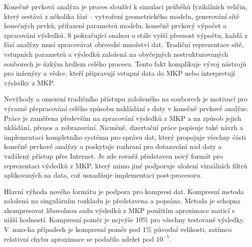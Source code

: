 \noindent
Kone\v{c}n\v{e} prvkov\'a anal\'yza je proces slou\v{z}\'ic\'i k simulaci pr\r{u}b\v{e}h\r{u} fyzik\'aln\'ich veli\v{c}in, kter\'y sest\'av\'a z n\v{e}kolika f\'az\'i -- vytvo\v{r}en\'i geometrick\'eho modelu, generov\'an\'i s\'it\v{e} kone\v{c}n\'ych prvk\r{u}, p\v{r}i\v{r}azen\'i parametr\r{u} modelu, kone\v{c}n\v{e} prvkov\'y v\'ypo\v{c}et a zpracov\'an\'i v\'ysledk\r{u}. S pokra\v{c}uj\'ic\'i snahou o st\'ale vy\v{s}\v{s}\'i p\v{r}esnost v\'ypo\v{c}tu, ka\v{z}d\'a z f\'az\'i anal\'yzy mus\'i zpracov\'avat obrovsk\'e mno\v{z}stv\'i dat. Tradi\v{c}n\'i reprezentace s\'it\v{e}, vstupn\'ich parametr\r{u} a v\'ysledk\r{u} zalo\v{z}en\'a na oby\v{c}ejn\'ych nestrukturovan\'ych souborech je \'uzk\'ym hrdlem cel\'eho procesu. Tento fakt komplikuje v\'yvoj n\'astroj\r{u} pro in\v{z}en\'yry a v\v{e}dce, kte\v{r}\'i p\v{r}ipravuj\'i vstupn\'i data do MKP nebo interpretuj\'i v\'ysledky z MKP.

Nev\'yhody a omezen\'i tradi\v{c}n\'iho p\v{r}\'istupu zalo\v{z}en\'eho na souborech je motivac\'i pro v\'yrazn\'e p\v{r}epracov\'an\'i cel\'eho zp\r{u}sobu nakl\'ad\'an\'i s daty v kone\v{c}n\v{e} prvkov\'e anal\'yze. Pr\'ace je zam\v{e}\v{r}ena p\v{r}edev\v{s}\'im na zpracov\'an\'i v\'ysledk\r{u} z MKP a na zp\r{u}sob jejich ukl\'ad\'an\'i, p\v{r}enos a zobrazov\'an\'i. Nicm\'en\v{e}, dizerta\v{c}n\'i pr\'ace popisuje tak\'e n\'avrh a implementaci kompletn\'iho syst\'emu pro spr\'avu dat, kter\'y propojuje v\v{s}echny \v{c}\'asti kone\v{c}n\v{e} prvkov\'e anal\'yzy a poskytuje rozhran\'i pro dotazov\'an\'i nad daty a vzd\'alen\'y p\v{r}\'istup p\v{r}es Internet. Je zde rovn\v{e}\v{z} p\v{r}edstaven nov\'y form\'at pro reprezentaci v\'ysled\-k\r{u} z MKP, kter\'y mimo jin\'e podporuje ulo\v{z}en\'i vizu\'aln\'ich filtr\r{u} aplikovan\'ych na data, co\v{z} usnad\v{n}uje implementaci post-procesoru.

Hlavn\'i v\'yhoda nov\'eho form\'atu je podpora pro kompresi dat. Kompresn\'i metoda zalo\v{z}en\'a na singul\'arn\'im rozkladu je p\v{r}edstavena a pops\'ana. Metoda je schopna zkompresovat libovolnou sadu v\'ysledk\r{u} z MKP pou\v{z}it\'im aproximace matic\'i s ni\v{z}\v{s}\'i hodnost\'i. Kompresn\'i pom\v{e}r je nejv\'y\v{s}e 10\% pro v\v{s}echny testovan\'e v\'ysledky. V~mno-ha p\v{r}\'ipadech je kompresn\'i pom\v{e}r pod 1\% p\r{u}vodn\'i velikosti, zat\'imco relativn\'i chybu aproximace se poda\v{r}ilo udr\v{z}et pod $10^{-5}$.

